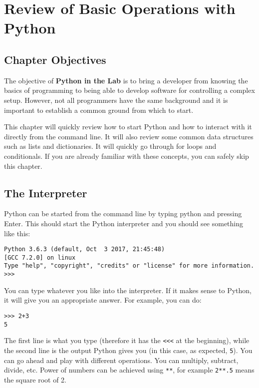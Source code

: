 \chapter{Review of Basic Operations with Python}\label{review-of-basic-operations-withpython}

\section{Chapter Objectives}\label{chapterobjectives}

The objective of \textbf{Python in the Lab} is to bring a developer from
knowing the basics of programming to being able to develop software for
controlling a complex setup. However, not all programmers have the same
background and it is important to establish a common ground from which
to start.

This chapter will quickly review how to start Python and how to interact
with it directly from the command line. It will also review some common
data structures such as lists and dictionaries. It will quickly go
through for loops and conditionals. If you are already familiar with
these concepts, you can safely skip this chapter.

\section{The Interpreter}\label{theinterpreter}
Python can be started from the command line by typing python and
pressing Enter. This should start the Python interpreter and you should
see something like this:

\begin{verbatim}
Python 3.6.3 (default, Oct  3 2017, 21:45:48)
[GCC 7.2.0] on linux
Type "help", "copyright", "credits" or "license" for more information.
>>>
\end{verbatim}

You can type whatever you like into the interpreter. If it makes sense
to Python, it will give you an appropriate answer. For example, you
can do:

\begin{verbatim}
>>> 2+3
5
\end{verbatim}

The first line is what you type (therefore it has the
\texttt{<<<} at the beginning),
while the second line is the output Python gives you (in this case, as
expected, \texttt{5}). You can go ahead and play with different
operations. You can multiply, subtract, divide, etc. Power of numbers
can be achieved using \texttt{**}, for example \texttt{2**.5} means the
square root of 2.

